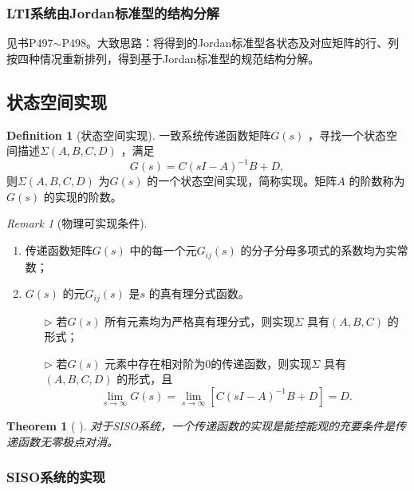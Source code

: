 \documentclass[14pt,a4paper]{article}
\theoremstyle{plain}
\newtheorem{thm}{Theorem}[section]
\theoremstyle{definition}
\newtheorem*{dfn}{Definition}
\theoremstyle{remark}
\newtheorem{rmk}{Remark}[section]
\theoremstyle{plain}
\theoremstyle{plain}
\theoremstyle{plain}
\theoremstyle{definition}
\theoremstyle{remark}
\numberwithin{equation}{section}
\begin{document}
			\subsubsection{LTI系统由Jordan标准型的结构分解}%
			\label{ssub:lti系统由jordan标准型的结构分解}
				见书P497$\sim$P498。大致思路：将得到的Jordan标准型各状态及对应矩阵的行、列按四种情况重新排列，得到基于Jordan标准型的规范结构分解。	
			
		\subsection{状态空间实现}%
		\label{sub:状态空间实现} 

			\begin{dfn}[状态空间实现]  
			\label{dfn:状态空间实现}
			一致系统传递函数矩阵$G(s)$ ，寻找一个状态空间描述$\Sigma\left( A,B,C,D \right) $ ，满足
			\[
				G(s) = C\left( sI - A \right) ^{-1}B + D
			,\] 
			则$\Sigma\left( A,B,C,D \right) $ 为$G(s)$ 的一个状态空间实现，简称实现。矩阵$A$ 的阶数称为$G(s)$ 的实现的阶数。
			\end{dfn}

			\begin{rmk}[物理可实现条件]  
			\label{rmk:物理可实现条件}
				\ 
				\begin{enumerate}
					\item 传递函数矩阵$G(s)$ 中的每一个元$G_{ij}(s)$ 的分子分母多项式的系数均为实常数；
					\item $G(s)$ 的元$G_{ij}(s)$ 是$s$ 的真有理分式函数。
						\begin{itemize}
							\item[$\triangleright$] 若$G(s)$ 所有元素均为严格真有理分式，则实现$\Sigma $ 具有$\left( A,B,C \right)$ 的形式；
							\item[$\triangleright$] 若$G(s)$ 元素中存在相对阶为0的传递函数，则实现$\Sigma $ 具有\\$\left( A,B,C,D \right)$ 的形式，且
								\[
									\lim_{s\to \infty}G(s) = \lim_{s\to \infty} \left[ C(sI-A)^{-1}B+D \right] = D
								.\] 
						\end{itemize}  
				\end{enumerate} 
			\end{rmk} 

			\begin{thm}[ ]  
			\label{the:821}
				对于SISO系统，一个传递函数的实现是能控能观的\emph{充要条件}是传递函数无零极点对消。
			\end{thm} 

			\subsubsection{SISO系统的实现}%
			\label{ssub:siso系统的实现}
		
\end{document}
